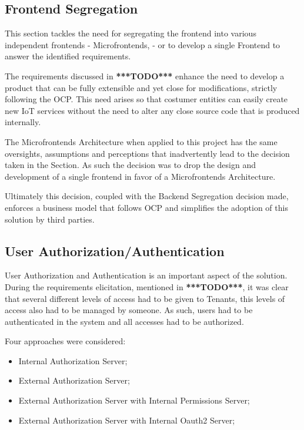\subsection{Frontend Segregation}
\label{subsec:design:alternatives:frontend}

This section tackles the need for segregating the frontend into various independent frontends - Microfrontends, \cite{microfrontends} - or to develop a single Frontend to answer the identified requirements.

The requirements discussed in \textbf{***TODO***} enhance the need to develop a product that can be fully extensible and yet close for modifications, strictly following the \gls{OCP}. This need arises so that costumer entities can easily create new \gls{IoT} services without the need to alter any close source code that is produced internally.

The Microfrontends Architecture when applied to this project has the same oversights, assumptions and perceptions that inadvertently lead to the decision taken in the  Section. As such the decision was to drop the design and development of a single frontend in favor of a Microfrontends Architecture.

Ultimately this decision, coupled with the Backend Segregation decision made, enforces a business model that follows \gls{OCP} and simplifies the adoption of this solution by third parties.

\subsection{User Authorization/Authentication}
\label{subsec:design:alternatives:auth}

User Authorization and Authentication is an important aspect of the solution. During the requirements elicitation, mentioned in \textbf{***TODO***}, it was clear that several different levels of access had to be given to Tenants, this levels of access also had to be managed by someone. As such, users had to be authenticated in the system and all accesses had to be authorized.

Four approaches were considered:

\begin{itemize}
   \item Internal Authorization Server;
   \item External Authorization Server;
   \item External Authorization Server with Internal Permissions Server;
   \item External Authorization Server with Internal Oauth2 Server;
\end{itemize}

